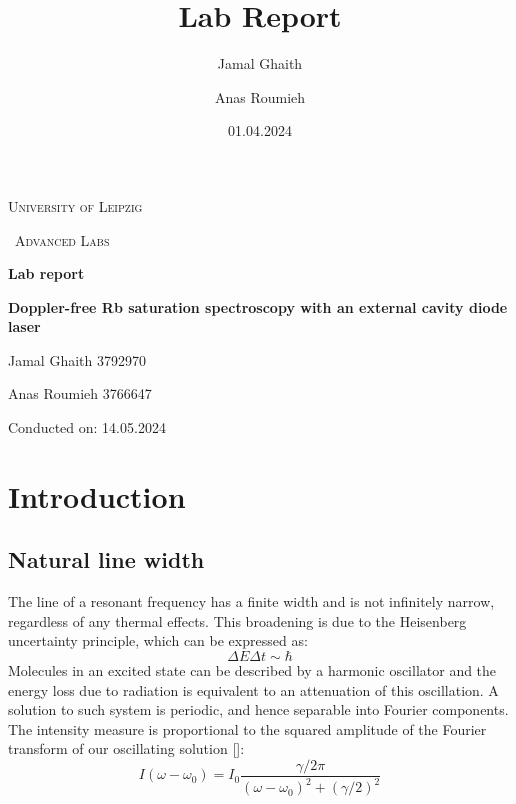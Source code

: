 \documentclass{article}
\title{Lab Report}
\author{Jamal Ghaith}
\author{Anas Roumieh}
\date{01.04.2024}
\begin{document}
\begin{titlepage}
	\centering
	{\scshape\LARGE University of Leipzig \par}
	\vspace{1cm}
	{\scshape\ Advanced Labs\par}
	\vspace{1.5cm}
	{\huge\bfseries Lab report\par}
	\vspace{2cm}
	{\huge\bfseries Doppler-free Rb saturation spectroscopy with an external cavity diode laser\par}
	\vspace{2cm}
	{\Large Jamal Ghaith 3792970\par}
    {\Large Anas Roumieh 3766647\par}
	\vfill

    {\Large Conducted on:  14.05.2024\par}
	\vfill
\end{titlepage}

\tableofcontents
{}
\pagebreak{}

\section{Introduction}

\subsection{Natural line width}
The line of a resonant frequency has a finite width and is not infinitely narrow, regardless of any thermal effects. This broadening is due to the Heisenberg uncertainty principle, which can be expressed as: 
\begin{equation}
    \Delta E\Delta t \sim \hbar
\end{equation}
Molecules in an excited state can be described by a harmonic oscillator and the energy loss due to radiation is equivalent to an attenuation of this oscillation. A solution to such system is periodic, and hence separable into Fourier components. The intensity measure is proportional to the squared amplitude of the Fourier transform of our oscillating solution [\cite{demtroder_2008_laser}]: 
\begin{equation}
    I(\omega-\omega_0) = I_0\frac{\gamma/2\pi}{(\omega-\omega_0)^2+(\gamma/2)^2}
\end{equation}
\end{document}
